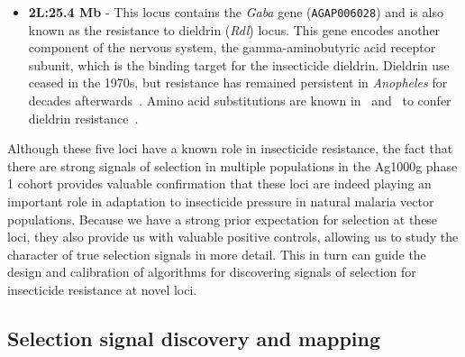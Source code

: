 \documentclass[a4paper,11pt,abstracton,hidelinks]{scrartcl}
\begin{document}
\begin{itemize}
\item \textbf{2L:25.4 Mb} - This locus contains the \textit{Gaba} gene (\texttt{AGAP006028}) and is also known as the resistance to dieldrin (\textit{Rdl}) locus.
%
This gene encodes another component of the nervous system,  the gamma-aminobutyric acid receptor subunit, which is the binding target for the insecticide dieldrin.
%
Dieldrin use ceased in the 1970s, but resistance has remained persistent in \textit{Anopheles} for decades afterwards~\parencite{Du2005}.
%
Amino acid substitutions are known in \agam\ and \acol\ to confer dieldrin resistance~\parencite{Du2005,Lawniczak2010}.
\end{itemize}


Although these five loci have a known role in insecticide resistance, the fact that there are strong signals of selection in multiple populations in the Ag1000g phase 1 cohort provides valuable confirmation that these loci are indeed playing an important role in adaptation to insecticide pressure in natural malaria vector populations.
%
Because we have a strong prior expectation for selection at these loci, they also provide us with valuable positive controls, allowing us to study the character of true selection signals in more detail.
%
This in turn can guide the design and calibration of algorithms for discovering signals of selection for insecticide resistance at novel loci.


\subsection{Selection signal discovery and mapping}\label{subsec:signal-discovery}
\end{document}
